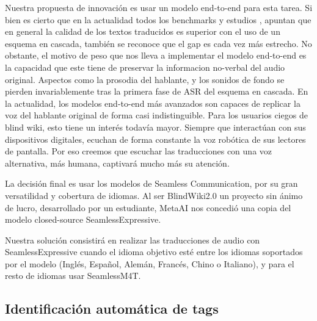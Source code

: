 Nuestra propuesta de innovación es usar un modelo end-to-end para esta tarea. Si bien es cierto que en la actualidad todos los benchmarks \cite{iwslt-findings} y estudios \cite{etchegoyhen2022cascade}, \cite{Sethiya2025} apuntan que en general la calidad de los textos traducidos es superior con el uso de un esquema en cascada, también se reconoce que el gap es cada vez más estrecho.
No obstante, el motivo de peso que nos lleva a implementar el modelo end-to-end es la capacidad que este tiene de preservar la informacion no-verbal del audio original. Aspectos como la prosodia del hablante, y los sonidos de fondo se pierden invariablemente tras la primera fase de ASR del esquema en cascada. En la actualidad, los modelos end-to-end más avanzados son capaces de replicar la voz del hablante original de forma casi indistinguible.  
Para los usuarios ciegos de blind wiki, esto tiene un interés todavía mayor. Siempre que interactúan con sus dispositivos digitales, ecuchan de forma constante la voz robótica de sus lectores de pantalla. Por eso creemos que escuchar las traducciones con una voz alternativa, más humana, captivará mucho más su atención. 

La decisión final es usar los modelos de Seamless Communication, por su gran versatilidad y cobertura de idiomas. Al ser BlindWiki2.0 un proyecto sin ánimo de lucro, desarrollado por un estudiante, MetaAI nos concedió una copia del modelo closed-source SeamlessExpressive.

Nuestra solución consistirá en realizar las traducciones de audio con SeamlessExpressive cuando el idioma objetivo esté entre los idiomas soportados por el modelo (Inglés, Español, Alemán, Francés, Chino o Italiano), y para el resto de idiomas usar SeamlessM4T.

\subsection{Identificación automática de tags}

